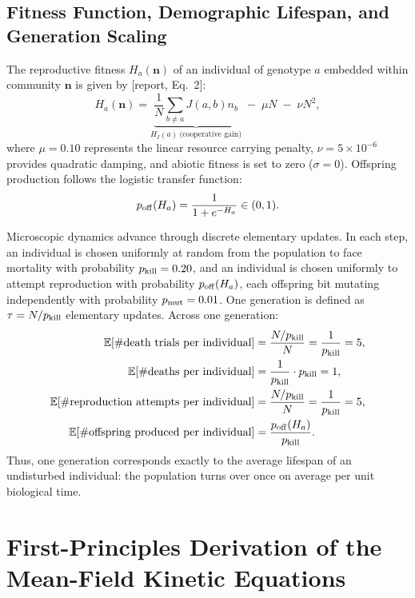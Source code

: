 \documentclass[11pt,a4paper]{article}
\newcommand{\pk}{p_{\rm kill}}
\newcommand{\pmut}{p_{\rm mut}}
\newcommand{\poff}{p_{\rm off}}
\newcommand{\R}[1]{\textcolor{blue!55!black}{[report, #1]}}
\begin{document}
\subsection{Fitness Function, Demographic Lifespan, and Generation Scaling}

The reproductive fitness $H_a(\mathbf{n})$ of an individual of genotype $a$ embedded within community $\mathbf{n}$ is given by \R{Eq.~2}:
\begin{equation}
H_a(\mathbf{n}) = \underbrace{\frac{1}{N} \sum_{b \neq a} J(a,b) n_b}_{H_I(a)\ \text{(cooperative gain)}} \;-\; \mu N \;-\; \nu N^2,
\label{eq:H_supp2}
\end{equation}
where $\mu = 0.10$ represents the linear resource carrying penalty, $\nu = 5 \times 10^{-6}$ provides quadratic damping, and abiotic fitness is set to zero ($\sigma = 0$). Offspring production follows the logistic transfer function:
\begin{equation}
\poff(H_a) = \frac{1}{1 + e^{-H_a}} \in (0,1).
\label{eq:poff_supp2}
\end{equation}

Microscopic dynamics advance through discrete elementary updates. In each step, an individual is chosen uniformly at random from the population to face mortality with probability $\pk = 0.20$, and an individual is chosen uniformly to attempt reproduction with probability $\poff(H_a)$, each offspring bit mutating independently with probability $\pmut = 0.01$. One generation is defined as $\tau = N / \pk$ elementary updates. Across one generation:
\begin{align}
\mathbb{E}[\#\text{death trials per individual}] &= \frac{N/\pk}{N} = \frac{1}{\pk} = 5, \\
\mathbb{E}[\#\text{deaths per individual}] &= \frac{1}{\pk} \cdot \pk = 1, \\
\mathbb{E}[\#\text{reproduction attempts per individual}] &= \frac{N/\pk}{N} = \frac{1}{\pk} = 5, \\
\mathbb{E}[\#\text{offspring produced per individual}] &= \frac{\poff(H_a)}{\pk}.
\end{align}
Thus, one generation corresponds exactly to the average lifespan of an undisturbed individual: the population turns over once on average per unit biological time.

\section{First-Principles Derivation of the Mean-Field Kinetic Equations}
\label{sec:meanfield}
\end{document}
